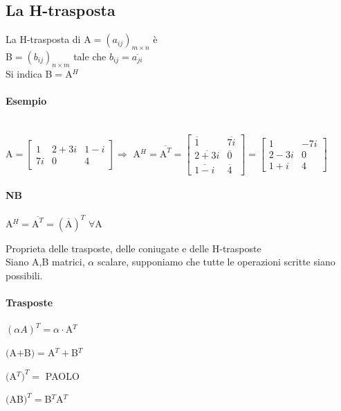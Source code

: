 \subsection{La H-trasposta}
La H-trasposta di A$=(a_{ij})_{m\times n}$ è \\
B$=(b_{ij})_{n\times m}$ tale che $b_{ij}=\overline{a_{ji}}$\\
Si indica B$=$A$^H$
\paragraph{Esempio} \hspace{1cm}\\
A$= 
\begin{bmatrix}
    1 & 2+3i & 1-i\\
    7i & 0 & 4
\end{bmatrix}
\Longrightarrow$ 
A$^H=\overline{{\textrm{A}}^T}= 
\begin{bmatrix}
    \overline{1} & \overline{7i}\\
    \overline{2+3i} & \overline{0}\\
    \overline{1-i} & \overline{4}
\end{bmatrix}
=
\begin{bmatrix}
    1 & -7i\\
    2-3i & 0\\
    1+i & 4
\end{bmatrix}
$
\paragraph{NB} A$^H=\overline{\textrm{A}^T}=(\overline{\textrm{A}})^T$ $\forall$A


{\color{red} 
Proprieta delle trasposte, delle coniugate e delle H-trasposte
}\\
Siano A,B matrici, $\alpha$ scalare, supponiamo che tutte le operazioni scritte siano possibili.
\paragraph{Trasposte}
\begin{enumerate}
    \item $(\alpha A)^T=\alpha\cdot$A$^T$
    \item $($A$+$B$)=$A$^T+$B$^T$
    \item $($A$^T)^T=$ PAOLO
        {\color{red}
    \item $($AB$)^T=$B$^T$A$^T$
        }
\end{enumerate}

